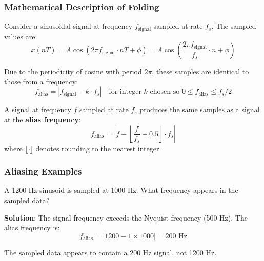 \subsubsection{Mathematical Description of Folding}

Consider a sinusoidal signal at frequency $f_{\text{signal}}$ sampled at rate $f_s$. The sampled values are:
\begin{equation}
x(nT) = A \cos(2\pi f_{\text{signal}} \cdot nT + \phi) = A \cos\left(\frac{2\pi f_{\text{signal}}}{f_s} \cdot n + \phi\right)
\label{eq:sampled_sinusoid}
\end{equation}

Due to the periodicity of cosine with period $2\pi$, these samples are identical to those from a frequency:
\begin{equation}
f_{\text{alias}} = |f_{\text{signal}} - k \cdot f_s| \quad \text{for integer } k \text{ chosen so } 0 \leq f_{\text{alias}} \leq f_s/2
\label{eq:alias_frequency}
\end{equation}

\begin{tcolorbox}[colback=red!5!white,colframe=red!75!black,sharp corners,title=Aliasing Formula]
A signal at frequency $f$ sampled at rate $f_s$ produces the same samples as a signal at the \textbf{alias frequency}:
\begin{equation}
f_{\text{alias}} = \left| f - \left\lfloor \frac{f}{f_s} + 0.5 \right\rfloor \cdot f_s \right|
\label{eq:alias_formula}
\end{equation}
where $\lfloor \cdot \rfloor$ denotes rounding to the nearest integer.
\end{tcolorbox}

\subsubsection{Aliasing Examples}

\begin{examplebox}
A 1200 Hz sinusoid is sampled at 1000 Hz. What frequency appears in the sampled data?

\textbf{Solution}: The signal frequency exceeds the Nyquist frequency (500 Hz). The alias frequency is:
\begin{equation*}
f_{\text{alias}} = |1200 - 1 \times 1000| = 200 \text{ Hz}
\end{equation*}

The sampled data appears to contain a 200 Hz signal, not 1200 Hz.
\end{examplebox}

